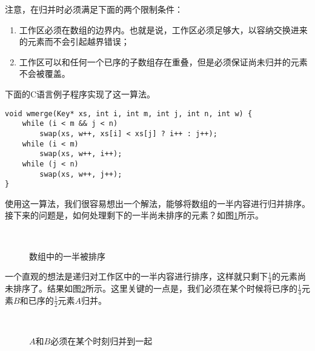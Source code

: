 \documentclass{ctexart}
\begin{document}
注意，在归并时必须满足下面的两个限制条件：

\begin{enumerate}
\item 工作区必须在数组的边界内。也就是说，工作区必须足够大，以容纳交换进来的元素而不会引起越界错误；
\item 工作区可以和任何一个已序的子数组存在重叠，但是必须保证尚未归并的元素不会被覆盖。
\end{enumerate}

下面的C语言例子程序实现了这一算法。

\lstset{language=C}
\begin{lstlisting}
void wmerge(Key* xs, int i, int m, int j, int n, int w) {
    while (i < m && j < n)
        swap(xs, w++, xs[i] < xs[j] ? i++ : j++);
    while (i < m)
        swap(xs, w++, i++);
    while (j < n)
        swap(xs, w++, j++);
}
\end{lstlisting}

使用这一算法，我们很容易想出一个解法，能够将数组的一半内容进行归并排序。接下来的问题是，如何处理剩下的一半尚未排序的元素？如图\ref{fig:merge-in-place-start}所示。

\begin{figure}[htbp]
 \centering
       \\
 \caption{数组中的一半被排序}
 \label{fig:merge-in-place-start}
\end{figure}

一个直观的想法是递归对工作区中的一半内容进行排序，这样就只剩下$\frac{1}{4}$的元素尚未排序了。结果如图\ref{fig:merge-in-place-quater}所示。这里关键的一点是，我们必须在某个时候将已序的$\frac{1}{4}$元素$B$和已序的$\frac{1}{2}$元素$A$归并。

\begin{figure}[htbp]
 \centering
       \\
 \caption{$A$和$B$必须在某个时刻归并到一起}
 \label{fig:merge-in-place-quater}
\end{figure}
\end{document}
